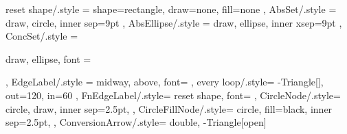 \newcommand{\Definition}[2]{%
  \begin{definition}{#1}{}
  #2
  \end{definition}%
}

\newfontfamily{}

\setlength{\epigraphwidth}{.618\textwidth}%
\tikzset
  {
    reset shape/.style = {
      shape=rectangle,
      draw=none,
      fill=none
    },
    AbsSet/.style = {
      draw,
      circle,
      inner sep=9pt
    },
    AbsEllipse/.style ={
      draw,
      ellipse,
      inner xsep=9pt
    },
    ConcSet/.style = {
      draw,
      ellipse,
      font = {\itshape\strut}
    },
    EdgeLabel/.style = {
      midway,
      above,
      font=\small
    },
    every loop/.style={
        -{Triangle[]},
        out=120,
        in=60
    },
    FnEdgeLabel/.style={
      reset shape,
      font=\footnotesize
    },
    CircleNode/.style={
      circle, 
      draw,
      inner sep=2.5pt,
    },
    CircleFillNode/.style={
      circle, 
      fill=black,
      inner sep=2.5pt,
    },
    ConversionArrow/.style={
      double, 
      -{Triangle[open]}
    }
  }%

\newenvironment{langscibars}{\begin{axis}[ybar,xtick=data, xticklabels from table={\mydata}{pos},
        width  = \textwidth,
	height = .3\textheight,
    	nodes near coords,
	xtick=data,
	x tick label style={},
	ymin=0,
        ]}{\end{axis}}

\newcommand{\langscibar}[1]{\addplot+ table [x=i, y=#1] {\mydata};\addlegendentry{#1};}

\newcommand{\langscidata}[1]{\pgfplotstableread{#1}\mydata;}


\newcommand{\textstylePhono}[1]{#1}
\newcommand{\textstylePhonoApprofondissement}[1]{#1}
\newcommand{\textstylest}[1]{#1}
\newcommand{\textstyleTermes}[1]{\textsc{#1}}
\newcommand{\textstyleTermesapprof}[1]{\textsc{#1}}
\newcommand{\textstyleTermesapprofondissement}[1]{\textsc{#1}}

\newenvironment{styleExemplesuite}{}{}
\newenvironment{styleillustrationAFaire}{\begin{exe}\ex}{\end{exe}} %

